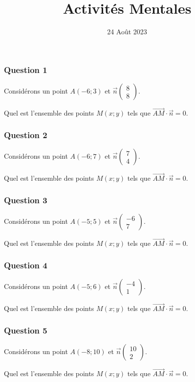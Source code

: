 \documentclass[15pt, mathserif]{beamer}
\title{Activités Mentales}
\date{24 Août 2023}
\begin{document}
\begin{frame}
    \titlepage
\end{frame}

\begin{frame} 
	\frametitle{Question 1}
Considérons un point $A(-6;3)$ et $\vec{n} \begin{pmatrix}
  8\\ 
 8 
 \end{pmatrix}$. 
 
  Quel est l'ensemble des points $M(x;y)$ tels que $\overrightarrow{AM} \cdot \vec{n}=0$.\end{frame}


\begin{frame} 
	\frametitle{Question 2}
Considérons un point $A(-6;7)$ et $\vec{n} \begin{pmatrix}
  7\\ 
 4 
 \end{pmatrix}$. 
 
  Quel est l'ensemble des points $M(x;y)$ tels que $\overrightarrow{AM} \cdot \vec{n}=0$.\end{frame}


\begin{frame} 
	\frametitle{Question 3}
Considérons un point $A(-5;5)$ et $\vec{n} \begin{pmatrix}
  -6\\ 
 7 
 \end{pmatrix}$. 
 
  Quel est l'ensemble des points $M(x;y)$ tels que $\overrightarrow{AM} \cdot \vec{n}=0$.\end{frame}


\begin{frame} 
	\frametitle{Question 4}
Considérons un point $A(-5;6)$ et $\vec{n} \begin{pmatrix}
  -4\\ 
 1 
 \end{pmatrix}$. 
 
  Quel est l'ensemble des points $M(x;y)$ tels que $\overrightarrow{AM} \cdot \vec{n}=0$.\end{frame}


\begin{frame} 
	\frametitle{Question 5}
Considérons un point $A(-8;10)$ et $\vec{n} \begin{pmatrix}
  10\\ 
 2 
 \end{pmatrix}$. 
 
  Quel est l'ensemble des points $M(x;y)$ tels que $\overrightarrow{AM} \cdot \vec{n}=0$.\end{frame}
\end{document}
